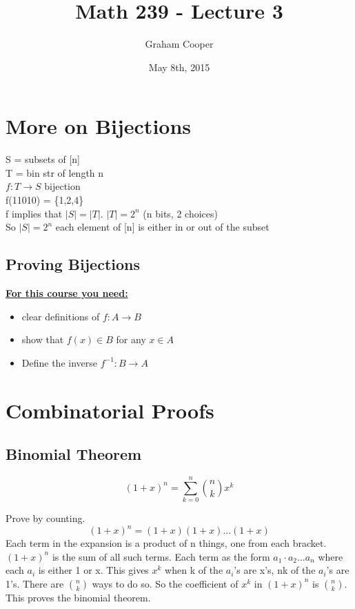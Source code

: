\documentclass[12pt]{article}
\title{\vspace{-15ex}Math 239 - Lecture 3\vspace{-1ex}}
\date{May 8th, 2015}
\author{Graham Cooper}
\newcommand{\myt}[1]{\textbf{\underline{#1}}}
\begin{document}
	\maketitle
	\section*{More on Bijections}
	S = subsets of [n]\\
	T = bin str of length n\\
	$f: T \rightarrow S $ bijection\\
	f(11010) = \{1,2,4\}\\
	
	f implies that $|S| = |T|$. $|T| = 2^n$ (n bits, 2 choices)\\
	So $|S| = 2^n$ each element of [n] is either in or out of the subset\\
	
	\subsection*{Proving Bijections}
	\myt{For this course you need:}\\
	\begin{itemize}
		\item clear definitions of $f: A \rightarrow B$
		\item show that $f(x) \in B$ for any $x \in A$
		\item Define the inverse $f^{-1}: B \rightarrow A$
	\end{itemize}
	
	\section*{Combinatorial Proofs}
	\subsection*{Binomial Theorem}
	$$(1+x)^n = \sum_{k = 0}^{n}{ n \choose k}x^k$$
	
	Prove by counting.\\
	$$(1+x)^n = (1+x)(1+x)...(1+x)$$
	Each term in the expansion is a product of n things, one from each bracket. $(1+x)^n$ is the sum of all such terms. Each term as the form $a_1 \cdot a_2 ... a_n$ where each $a_i$ is either 1 or x. This gives $x^k$ when k of the $a_i$'s are x's, nk of the $a_i$'s are 1's. There are ${n \choose k}$ ways to do so. So the coefficient of $x^k$ in $(1+x)^n$ is ${n \choose k}$. This proves the binomial theorem.\\
	
\end{document}
